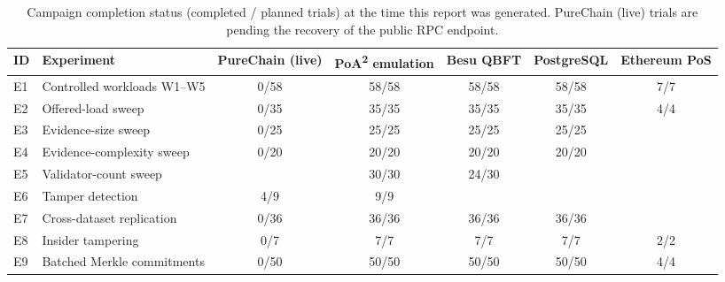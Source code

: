 \begin{table}[t]
\centering
\scriptsize
\caption{Campaign completion status (completed / planned trials) at the time this report was generated. PureChain (live) trials are pending the recovery of the public RPC endpoint.}
\label{tab:status}
\begin{tabular}{llccccc}
\toprule
ID & Experiment & PureChain (live) & PoA\textsuperscript{2} emulation & Besu QBFT & PostgreSQL & Ethereum PoS \\
\midrule
E1 & Controlled workloads W1--W5 & 0/58 & 58/58 & 58/58 & 58/58 & 7/7 \\
E2 & Offered-load sweep & 0/35 & 35/35 & 35/35 & 35/35 & 4/4 \\
E3 & Evidence-size sweep & 0/25 & 25/25 & 25/25 & 25/25 &  \\
E4 & Evidence-complexity sweep & 0/20 & 20/20 & 20/20 & 20/20 &  \\
E5 & Validator-count sweep &  & 30/30 & 24/30 &  &  \\
E6 & Tamper detection & 4/9 & 9/9 &  &  &  \\
E7 & Cross-dataset replication & 0/36 & 36/36 & 36/36 & 36/36 &  \\
E8 & Insider tampering & 0/7 & 7/7 & 7/7 & 7/7 & 2/2 \\
E9 & Batched Merkle commitments & 0/50 & 50/50 & 50/50 & 50/50 & 4/4 \\
\bottomrule
\end{tabular}
\end{table}
